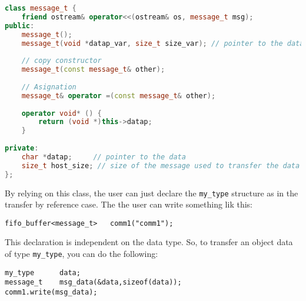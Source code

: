 \begin{lstlisting}[language=c++,caption={Declaration of the \texttt{message\_t} class provided by KisTA.},label=message_t_declaration]
class message_t {
    friend ostream& operator<<(ostream& os, message_t msg);
public:
    message_t();
    message_t(void *datap_var, size_t size_var); // pointer to the data and size
   
    // copy constructor
    message_t(const message_t& other);
   
    // Asignation
    message_t& operator =(const message_t& other);
   
    operator void* () {
        return (void *)this->datap;
    }
   
private:   
    char *datap;     // pointer to the data
    size_t host_size; // size of the message used to transfer the data by native host
};
\end{lstlisting}


By relying on this class, the user can just declare the \texttt{my\_type} structure as in the transfer by reference case. The the user can write something lik this:

\begin{lstlisting}[style=KistaCodeStyle, caption={Declaration of KisTA fifo buffer transporting a complex user structure.}, label=complex_struct_value]
fifo_buffer<message_t>   comm1("comm1");
\end{lstlisting}

This declaration is independent on the data type. So, to transfer an object data of type \texttt{my\_type}, you can do the following:

\begin{lstlisting}[style=KistaCodeStyle, caption={Declare a complex data structure, fill it and send it through a fifo buffer.}, label=complex_struct_value_use_write]
my_type      data;
message_t    msg_data(&data,sizeof(data));
comm1.write(msg_data);
\end{lstlisting}


